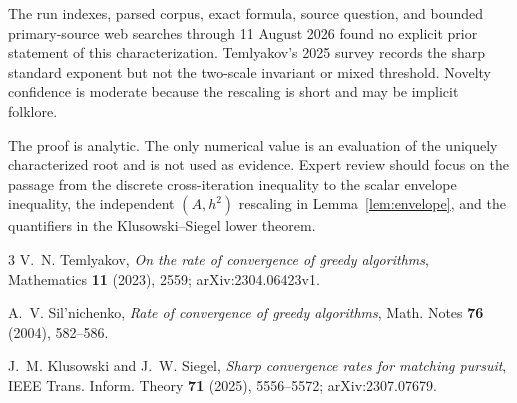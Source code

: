 \documentclass[11pt]{article}
\begin{document}
The run indexes, parsed corpus, exact formula, source question, and bounded
primary-source web searches through 11 August 2026 found no explicit prior
statement of this characterization.  Temlyakov's 2025 survey records the
sharp standard exponent but not the two-scale invariant or mixed threshold.
Novelty confidence is moderate because the rescaling is short and may be
implicit folklore.

The proof is analytic.  The only numerical value is an evaluation of the
uniquely characterized root and is not used as evidence.  Expert review
should focus on the passage from the discrete cross-iteration inequality to
the scalar envelope inequality, the independent $(A,h^2)$ rescaling in
Lemma~\ref{lem:envelope}, and the quantifiers in the Klusowski--Siegel lower
theorem.

\begin{thebibliography}{3}
V.~N. Temlyakov,
\newblock \emph{On the rate of convergence of greedy algorithms},
\newblock Mathematics \textbf{11} (2023), 2559; arXiv:2304.06423v1.

A.~V. Sil'nichenko,
\newblock \emph{Rate of convergence of greedy algorithms},
\newblock Math. Notes \textbf{76} (2004), 582--586.

J.~M. Klusowski and J.~W. Siegel,
\newblock \emph{Sharp convergence rates for matching pursuit},
\newblock IEEE Trans. Inform. Theory \textbf{71} (2025), 5556--5572;
arXiv:2307.07679.
\end{thebibliography}
\end{document}
